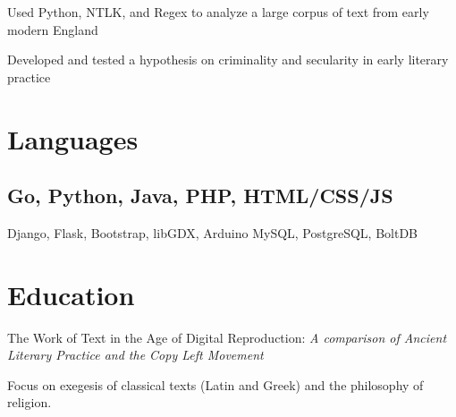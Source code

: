 \documentclass[]{deedy-resume-openfont}
\begin{document}
\begin{tightemize}
\item Used Python, NTLK, and Regex to analyze a large corpus of text from early modern England
\item Developed and tested a hypothesis on criminality and secularity in early literary practice
\end{tightemize}
\sectionsep

\section{Languages}
\subsection{Go, Python, Java, PHP, HTML/CSS/JS} 
Django, Flask, Bootstrap, libGDX, Arduino \textbullet{} MySQL, PostgreSQL, BoltDB
\sectionsep


\section{Education}
The Work of Text in the Age of Digital Reproduction:
\textit{A comparison of Ancient Literary Practice and the Copy Left Movement}
\sectionsep %

Focus on exegesis of classical texts (Latin and Greek) and the philosophy of religion.
\sectionsep
\end{document}

